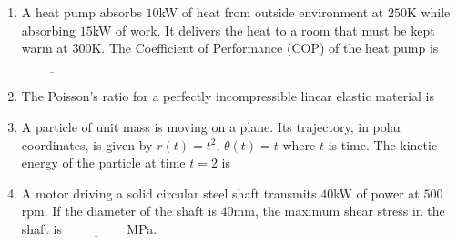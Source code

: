\documentclass[journal]{IEEEtran}
\begin{document}
\begin{enumerate}[leftmargin=0pt]
    \hfill{}

    \item A heat pump absorbs $10$kW of heat from outside environment at $250$K while absorbing $15$kW of work. It delivers the heat to a room that must be kept warm at $300$K. The Coefficient of Performance (COP) of the heat pump is
        $\underline{\hspace{2cm}}$

    \hfill{}

    \item The Poisson's ratio for a perfectly incompressible linear elastic material is 

    \hfill{}

    \begin{enumerate}
    \end{enumerate}

    \item A particle of unit mass is moving on a plane. Its trajectory, in polar coordinates, is given by $r(t) = t^2,\,\theta(t) = t$ where $t$ is time. The kinetic energy of the particle at time $t = 2$ is

    \hfill{}

    \begin{enumerate}
    \end{enumerate}

    \item A motor driving a solid circular steel shaft transmits $40$kW of power at $500$rpm. If the diameter of the shaft is $40$mm, the maximum shear stress in the shaft is
    $\underline{\hspace{2cm}}$MPa.


\end{enumerate}
\end{document}
